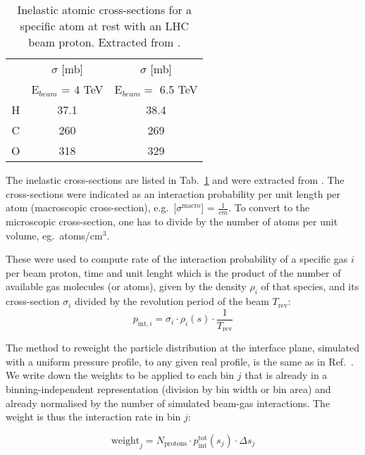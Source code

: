 \begin{table}
   \centering
   \caption{Inelastic atomic cross-sections for a specific atom at rest with an LHC beam proton. Extracted from \fluka.}
   \begin{tabular}{c|c|c}\hline
     &  $\sigma$ [mb] &  $\sigma$ [mb] \\
       & E$_{beam}$ = 4 TeV   & E$_{beam} =$ 6.5 TeV \\ \hline\hline
       H & 37.1 & 38.4 \\
       C & 260& 269 \\
       O & 318 & 329 \\
       \hline
   \end{tabular}
   \label{tab:atomicXsections}
\end{table}

The inelastic cross-sections are listed in Tab.~\ref{tab:atomicXsections} and were extracted from \fluka. The cross-sections were indicated as an interaction probability per unit length per atom (macroscopic cross-section), e.g.~[$\sigma^{\textrm{macro}}$] = $\frac{1}{cm}$. To convert to the microscopic cross-section, one has to divide by the number of atoms per unit volume, eg.~atoms/cm$^3$.

These were used to compute rate of the interaction probability of a specific gas $i$ per beam proton, time and unit lenght which is the product of the number of available gas molecules (or atoms), given by the density $\rho_i$ of that species, and its cross-section $\sigma_i$ divided by the revolution period of the beam $T_{\mathrm{rev}}$:
\begin{equation} \label{eq2}
p_{\mathrm{int},i} = \sigma_{i} \cdot \rho_{i}(s) \cdot \frac{1}{T_{\mathrm{rev}}}
\end{equation}

The method to reweight the particle distribution at the interface plane, simulated with a uniform pressure profile, to any given real profile, is the same as in Ref.~\cite{nimPaperRod}. We write down the weights to be applied to each bin $j$ that is already in a binning-independent representation (division by bin width or bin area) and already normalised by the number of simulated beam-gas interactions. The weight is thus the interaction rate in bin $j$:

\begin{equation} \label{eq3}
\mathrm{weight}_j = N_{\mathrm{protons}} \cdot p_{\mathrm{int}}^{\mathrm{tot}} (s_j) \cdot \Delta s_{j} 
\end{equation}

